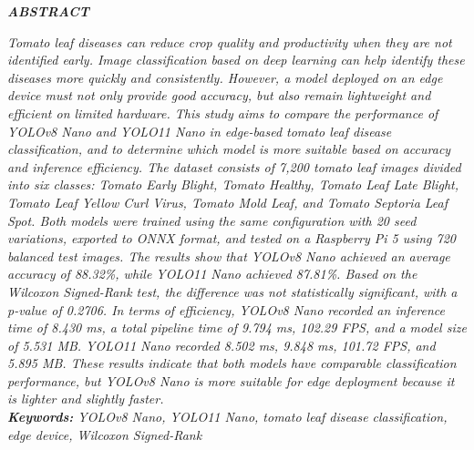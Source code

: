 
\begingroup
\singlespacing

\clearpage
{}
\begin{center}
    \textbf{\textit{ABSTRACT}}\\[0.5cm]
\end{center}

\textit{Tomato leaf diseases can reduce crop quality and productivity when they are not identified early. Image classification based on deep learning can help identify these diseases more quickly and consistently. However, a model deployed on an edge device must not only provide good accuracy, but also remain lightweight and efficient on limited hardware. This study aims to compare the performance of YOLOv8 Nano and YOLO11 Nano in edge-based tomato leaf disease classification, and to determine which model is more suitable based on accuracy and inference efficiency. The dataset consists of 7,200 tomato leaf images divided into six classes: Tomato Early Blight, Tomato Healthy, Tomato Leaf Late Blight, Tomato Leaf Yellow Curl Virus, Tomato Mold Leaf, and Tomato Septoria Leaf Spot. Both models were trained using the same configuration with 20 seed variations, exported to ONNX format, and tested on a Raspberry Pi 5 using 720 balanced test images. The results show that YOLOv8 Nano achieved an average accuracy of 88.32\%, while YOLO11 Nano achieved 87.81\%. Based on the Wilcoxon Signed-Rank test, the difference was not statistically significant, with a p-value of 0.2706. In terms of efficiency, YOLOv8 Nano recorded an inference time of 8.430 ms, a total pipeline time of 9.794 ms, 102.29 FPS, and a model size of 5.531 MB. YOLO11 Nano recorded 8.502 ms, 9.848 ms, 101.72 FPS, and 5.895 MB. These results indicate that both models have comparable classification performance, but YOLOv8 Nano is more suitable for edge deployment because it is lighter and slightly faster.} \\[1cm]

\noindent\textit{\textbf{Keywords:} YOLOv8 Nano, YOLO11 Nano, tomato leaf disease classification, edge device, Wilcoxon Signed-Rank}

\endgroup